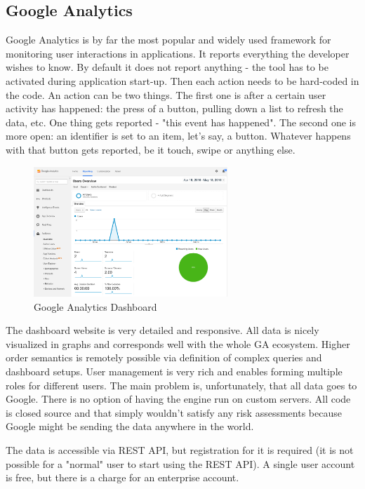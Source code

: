 \subsection{Google Analytics}

Google Analytics is by far the most popular and widely used framework for monitoring user interactions in applications. It reports everything the developer wishes to know. By default it does not report anything - the tool has to be activated during application start-up. Then each action needs to be hard-coded in the code. An action can be two things. The first one is after a certain user activity has happened: the press of a button, pulling down a list to refresh the data, etc. One thing gets reported - "this event has happened". The second one is more open: an identifier is set to an item, let's say, a button. Whatever happens with that button gets reported, be it touch, swipe or anything else.

\begin{figure}[!ht]
	\centering
	\includegraphics[width=0.65\textwidth]{figures/02_analysis/analytics}
    \caption{Google Analytics Dashboard}
\end{figure}

The dashboard website is very detailed and responsive. All data is nicely visualized in graphs and corresponds well with the whole GA ecosystem. Higher order semantics is remotely possible via definition of complex queries and dashboard setups. User management is very rich and enables forming multiple roles for different users. The main problem is, unfortunately, that all data goes to Google. There is no option of having the engine run on custom servers. All code is closed source and that simply wouldn't satisfy any risk assessments because Google might be sending the data anywhere in the world.

The data is accessible via REST API, but registration for it is required (it is not possible for a "normal" user to start using the REST API). A single user account is free, but there is a charge for an enterprise account.

